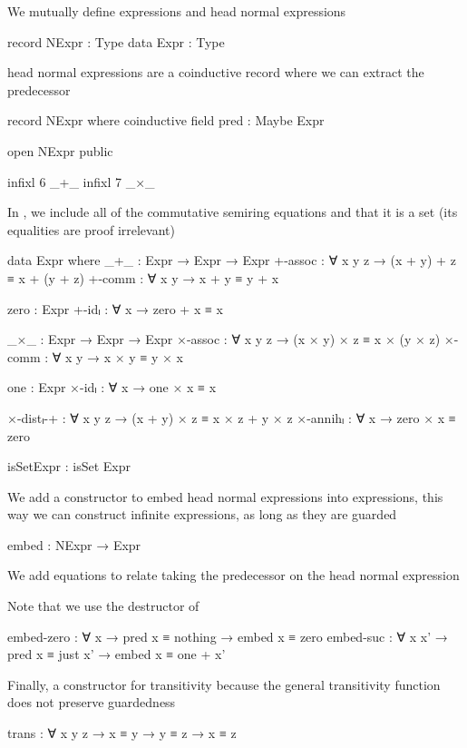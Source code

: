 We mutually define expressions and head normal expressions
\begin{AgdaAlign}
\begin{code}
  record NExpr : Type
  data Expr : Type
\end{code}
head normal expressions are a coinductive record where we can extract the
predecessor
\begin{code}
  record NExpr where
    coinductive
    field pred : Maybe Expr
\end{code}
\begin{code}[hide]
  open NExpr public

  infixl 6 _+_
  infixl 7 _×_
\end{code}
In , we include all of the commutative semiring equations and
that it is a set (its equalities are proof irrelevant)
\begin{code}
  data Expr where
    _+_        : Expr → Expr → Expr
    +-assoc    : ∀ x y z → (x + y) + z ≡ x + (y + z)
    +-comm     : ∀ x y → x + y ≡ y + x

    zero       : Expr
    +-idₗ      : ∀ x → zero + x ≡ x

    _×_        : Expr → Expr → Expr
    ×-assoc    : ∀ x y z → (x × y) × z ≡ x × (y × z)
    ×-comm     : ∀ x y → x × y ≡ y × x

    one        : Expr
    ×-idₗ      : ∀ x → one × x ≡ x

    ×-distₗ-+  : ∀ x y z → (x + y) × z ≡ x × z + y × z
    ×-annihₗ   : ∀ x → zero × x ≡ zero

    isSetExpr  : isSet Expr
\end{code}
We add a constructor to embed head normal expressions into expressions, this way
we can construct infinite expressions, as long as they are guarded
\begin{code}
    embed : NExpr → Expr
\end{code}
We add equations to relate taking the predecessor on the head normal expression

Note that we use the destructor  of 
\begin{code}
    embed-zero  :
      ∀ x → pred x ≡ nothing → embed x ≡ zero
    embed-suc   :
      ∀ x x' → pred x ≡ just x' → embed x ≡ one + x'
\end{code}
Finally, a constructor for transitivity because the general transitivity
function does not preserve guardedness
\begin{code}
    trans : ∀ {x y z} → x ≡ y → y ≡ z → x ≡ z
\end{code}
\end{AgdaAlign}
